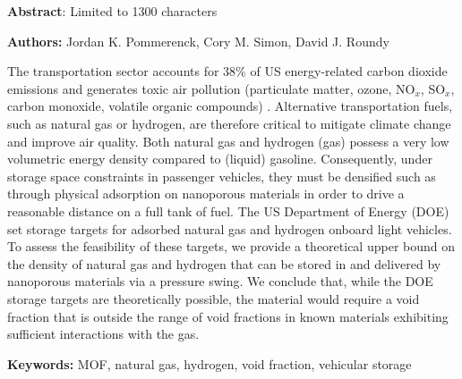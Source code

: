 \documentclass[letterpaper,onecolumn,amsmath,amssymb,jcp,aps,12pt]{revtex4-1}
\begin{document}
\begin{center}
    \textbf{Abstract}: Limited to 1300 characters
\end{center}

\center{}
\textbf{Authors:} Jordan K. Pommerenck, Cory M. Simon, David J. Roundy

\justify{}
The transportation sector accounts for 38\% of US energy-related carbon dioxide emissions \cite{useia} and generates toxic air pollution (particulate matter, ozone, NO$_x$, SO$_x$, carbon monoxide, volatile organic compounds) \cite{caiazzo2013air}. Alternative transportation fuels, such as natural gas or hydrogen, are therefore critical to mitigate climate change \cite{mcglade2015geographical} and improve air quality.
%
Both natural gas and hydrogen (gas) possess a very low volumetric energy density compared to (liquid) gasoline. Consequently, under storage space constraints in passenger vehicles, they must be densified such as through physical adsorption on nanoporous materials \cite{schoedel2016role} in order to drive a reasonable distance on a full tank of fuel.  
%
The US Department of Energy (DOE) set storage targets for adsorbed natural gas and hydrogen onboard light vehicles.
To assess the feasibility of these targets, we provide a theoretical upper bound on the density of natural gas and hydrogen that can be stored in and delivered by nanoporous materials via a pressure swing.
We conclude that, while the DOE storage targets are theoretically possible, the material would require a void fraction that is outside the range of void fractions in known materials exhibiting sufficient interactions with the gas.

\justify{}
\textbf{Keywords:} MOF, natural gas, hydrogen, void fraction, vehicular storage



\end{document}

